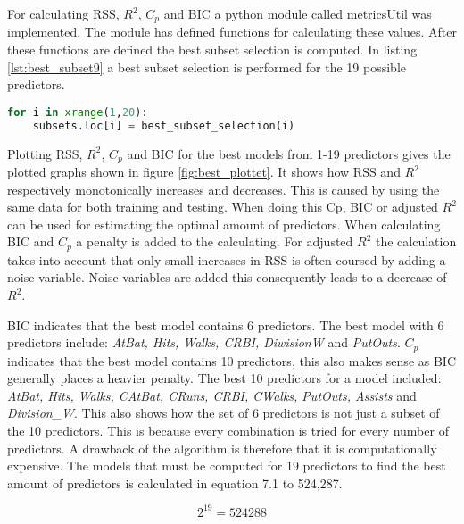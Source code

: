 For calculating RSS, $R^2$, $C_p$ and BIC a python module called metricsUtil was implemented. The module has defined functions for calculating these values. After these functions are defined the best subset selection is computed. In listing \ref{lst:best_subset9} a best subset selection is performed for the 19 possible predictors.

\begin{lstlisting}[language=Python, label=lst:best_subset9, caption=Calculating the best subset from 1 to 19 predictors]
for i in xrange(1,20):
	subsets.loc[i] = best_subset_selection(i)
\end{lstlisting}

Plotting RSS, $R^2$, $C_p$ and BIC for the best models from 1-19 predictors gives the plotted graphs shown in figure \ref{fig:best_plottet}. It shows how RSS and $R^2$ respectively monotonically increases and decreases. This is caused by using the same data for both training and testing. When doing this Cp, BIC or adjusted $R^2$ can be used for estimating the optimal amount of predictors. When calculating BIC and $C_p$ a penalty is added to the calculating. For adjusted $R^2$ the calculation takes into account that only small increases in RSS is often coursed by adding a noise variable. Noise variables are added this consequently leads to a decrease of $R^2$.

\FloatBarrier


BIC indicates that the best model contains 6 predictors. The best model with 6 predictors include: \emph{AtBat, Hits, Walks, CRBI, DiwisionW} and \emph{PutOuts}. $C_p$ indicates that the best model contains 10 predictors, this also makes sense as BIC generally places a heavier penalty. The best 10 predictors for a model included: \emph{AtBat, Hits, Walks, CAtBat, CRuns, CRBI, CWalks, PutOuts, Assists} and \emph{Division\_W}. This also shows how the set of 6 predictors is not just a subset of the 10 predictors. This is because every combination is tried for every number of predictors. A drawback of the algorithm is therefore that it is computationally expensive. The models that must be computed for 19 predictors to find the best amount of predictors is calculated in equation 7.1 to 524,287.

\begin{equation}
2^{19} = 524288
\end{equation}

